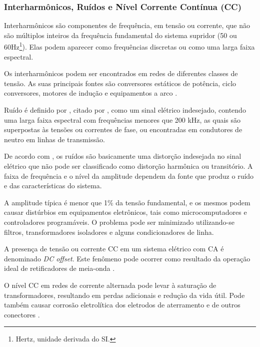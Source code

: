 \subsubsection{Interharmônicos, Ruídos e Nível Corrente Contínua (CC)}\label{qeeIRNCC}
%
\par
Interharmônicos são componentes de frequência, em tensão ou corrente, que não são múltiplos inteiros da frequência fundamental do sistema supridor (50 ou 60Hz\footnote{Hertz, unidade derivada do \ac{SI}.}). Elas podem aparecer como frequências discretas ou como uma larga faixa espectral.
\par
Os interharmônicos podem ser encontrados em redes de diferentes classes de tensão. As suas principais fontes são conversores estáticos de potência, ciclo conversores, motores de indução e equipamentos a arco \citep{DEL03}.
\par
Ruído é definido por \cite{OLIVE}, citado por \cite{DEL03}, como um sinal elétrico indesejado, contendo uma larga faixa espectral com frequências menores que 200 kHz, as quais são superpostas às tensões ou correntes de fase, ou encontradas em condutores de neutro em linhas de transmissão.
\par
De acordo com \cite{DUG96}, os ruídos são basicamente uma distorção indesejada no sinal elétrico que não pode ser classificado como distorção harmônica ou transitório. A faixa de frequência e o nível da amplitude dependem da fonte que produz o ruído e das características do sistema. 
\par
A amplitude típica é menor que 1\% da tensão fundamental, e os mesmos podem causar distúrbios em equipamentos eletrônicos, tais como microcomputadores e controladores programáveis. O problema pode ser minimizado utilizando-se filtros, transformadores isoladores e alguns condicionadores de linha.
\par
A presença de tensão ou corrente \ac{CC} em um sistema elétrico com \ac{CA} é denominado \emph{DC offset}. Este fenômeno pode ocorrer como resultado da operação ideal de retificadores de meia-onda \citep{OLIVE}.
\par
O nível CC em redes de corrente alternada pode levar à saturação de transformadores, resultando em perdas adicionais e redução da vida útil. Pode também causar corrosão eletrolítica dos eletrodos de aterramento e de outros conectores \citep{DEL03}.
